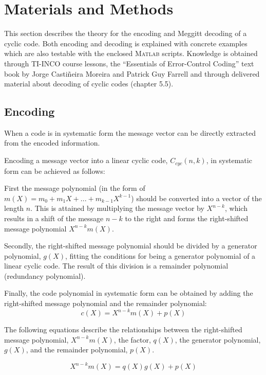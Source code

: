 \documentclass[Main]{subfiles}
\begin{document}
\section{Materials and Methods}
This section describes the theory for the encoding and Meggitt decoding of a cyclic code. 
Both encoding and decoding is explained with concrete examples which are also testable with the enclosed \textsc{Matlab} scripts. 
Knowledge is obtained through TI-INCO course lessons, the ``Essentials of Error-Control Coding'' text book by Jorge Casti\~{n}eira Moreira and Patrick Guy Farrell and through delivered material about decoding of cyclic codes (chapter 5.5).

\subsection{Encoding}
\noindent When a code is in systematic form the message vector can be directly extracted from the encoded information. 

\noindent Encoding a message vector into a linear cyclic code, $C_{cyc}(n,k)$, in systematic form can be achieved as follows:

\noindent First the message polynomial (in the form of $m(X) = m_{0} + m_{1}X+...+m_{k-1}X^{k-1}$) should be converted into a vector of the length $n$. 
This is attained by multiplying the message vector by $X^{n-k}$, which results in a shift of the message $n-k$ to the right and forms the right-shifted message polynomial $X^{n-k}m(X)$.

\noindent Secondly, the right-shifted message polynomial should be divided by a generator polynomial, $g(X)$, fitting the conditions for being a generator polynomial of a linear cyclic code. 
The result of this division is a remainder polynomial (redundancy polynomial).

\noindent Finally, the code polynomial in systematic form can be obtained by adding the right-shifted message polynomial and the remainder polynomial: 
\begin{equation}
c(X) = X^{n-k}m(X)+p(X)
\label{eq:code polynomail formular}
\end{equation}

\noindent The following equations describe the relationships between the right-shifted message polynomial, $X^{n-k}m(X)$, the factor, $q(X)$, the generator polynomial, $g(X)$, and the remainder polynomial, $p(X)$.  

\begin{equation}
X^{n-k}m(X) = q(X)g(X)+p(X)
\end{equation}
\end{document}
